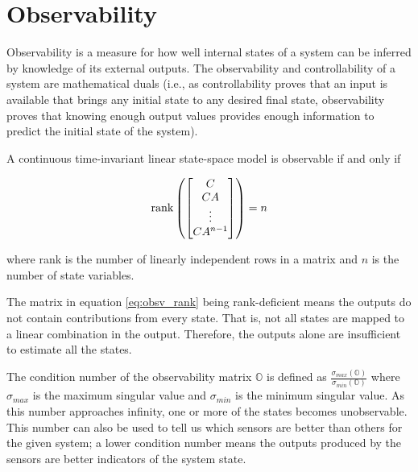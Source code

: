 \section{Observability}

Observability is a measure for how well internal \glspl{state} of a \gls{system}
can be inferred by knowledge of its external \glspl{output}. The observability
and controllability of a \gls{system} are mathematical duals (i.e., as
controllability proves that an \gls{input} is available that brings any initial
\gls{state} to any desired final \gls{state}, observability proves that knowing
enough \gls{output} values provides enough information to predict the initial
\gls{state} of the \gls{system}).
\begin{theorem}[Observability]
  A continuous \gls{time-invariant} linear state-space \gls{model} is observable
  if and only if

  \begin{equation}
    \operatorname{rank}\left(
    \begin{bmatrix}
      C \\
      CA \\
      \vdots \\
      CA^{n-1}
    \end{bmatrix}\right) = n \label{eq:obsv_rank}
  \end{equation}

  where rank is the number of linearly independent rows in a matrix and $n$ is
  the number of \gls{state} variables.
\end{theorem}

The matrix in equation \eqref{eq:obsv_rank} being rank-deficient means the
\glspl{output} do not contain contributions from every \gls{state}. That is, not
all \glspl{state} are mapped to a linear combination in the \gls{output}.
Therefore, the \glspl{output} alone are insufficient to estimate all the
\glspl{state}.

The condition number of the observability matrix $\mathbb{O}$ is defined as
$\frac{\sigma_{max}(\mathbb{O})}{\sigma_{min}(\mathbb{O})}$ where $\sigma_{max}$
is the maximum singular value and $\sigma_{min}$ is
the minimum singular value. As this number approaches infinity, one or more of
the \glspl{state} becomes unobservable. This number can also be used to tell us
which sensors are better than others for the given \gls{system}; a lower
condition number means the \glspl{output} produced by the sensors are better
indicators of the \gls{system} \gls{state}.
